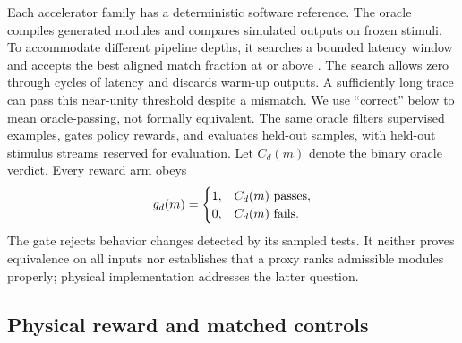 Each accelerator family has a deterministic software reference. The oracle
compiles generated modules and compares simulated outputs on frozen stimuli.
To accommodate different pipeline depths, it searches a bounded latency window and
accepts the best aligned match fraction at or above
.  The search allows zero through
 cycles of latency and discards
 warm-up outputs. A sufficiently long trace can pass
this near-unity threshold despite a mismatch. We use ``correct'' below to mean
oracle-passing, not formally equivalent. The same oracle filters supervised examples, gates
policy rewards, and evaluates held-out samples, with held-out stimulus streams
reserved for evaluation. Let $C_d(m)$ denote the binary oracle verdict.
Every reward arm obeys
\begin{equation}
g_d(m)=
\begin{cases}
1, & C_d(m)\text{ passes},\\
0, & C_d(m)\text{ fails}.
\end{cases}
\label{eq:gate}
\end{equation}
The gate rejects behavior changes detected by its sampled tests.  It neither
proves equivalence on all inputs nor establishes that a proxy ranks admissible
modules properly; physical implementation addresses the latter question.

\subsection{Physical reward and matched controls}

